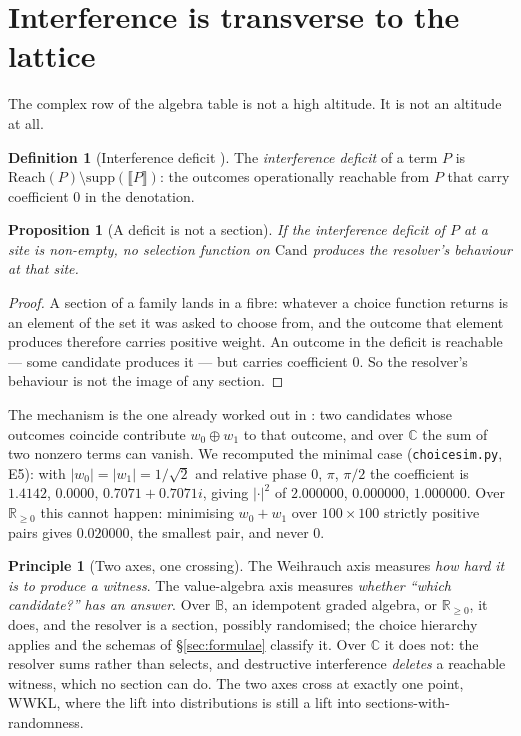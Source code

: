 \documentclass[11pt]{article}
\theoremstyle{definition}
\newtheorem{definition}{Definition}
\newtheorem{principle}{Principle}
\theoremstyle{plain}
\newtheorem{proposition}{Proposition}
\theoremstyle{remark}
\newcommand{\sumv}{\oplus}
\newcommand{\Bool}{\mathbb{B}}
\newcommand{\Rnn}{\mathbb{R}_{\geq 0}}
\newcommand{\Cx}{\mathbb{C}}
\newcommand{\Cand}{\mathrm{Cand}}
\newcommand{\sem}[1]{\llbracket #1 \rrbracket}
\newcommand{\WWKL}{\mathrm{WWKL}}
\begin{document}
\section{Interference is transverse to the lattice}\label{sec:transverse}

The complex row of the algebra table is not a high altitude. It is not an altitude at
all.

\begin{definition}[Interference deficit \cite{gradedwhere}]\label{def:deficit}
The \emph{interference deficit} of a term $P$ is
$\mathrm{Reach}(P) \setminus \mathrm{supp}(\sem{P})$: the outcomes operationally
reachable from $P$ that carry coefficient $0$ in the denotation.
\end{definition}

\begin{proposition}[A deficit is not a section]\label{prop:transverse}
If the interference deficit of $P$ at a site is non-empty, no selection function on
$\Cand$ produces the resolver's behaviour at that site.
\end{proposition}

\begin{proof}
A section of a family lands in a fibre: whatever a choice function returns is an
element of the set it was asked to choose from, and the outcome that element produces
therefore carries positive weight. An outcome in the deficit is reachable --- some
candidate produces it --- but carries coefficient $0$. So the resolver's behaviour is
not the image of any section.
\end{proof}

The mechanism is the one already worked out in \cite{gradedwhere}: two candidates whose
outcomes coincide contribute $w_0 \sumv w_1$ to that outcome, and over $\Cx$ the sum of
two nonzero terms can vanish. We recomputed the minimal case (\texttt{choicesim.py},
E5): with $|w_0| = |w_1| = 1/\sqrt2$ and relative phase $0$, $\pi$, $\pi/2$ the
coefficient is $1.4142$, $0.0000$, $0.7071{+}0.7071i$, giving $|{\cdot}|^2$ of
$2.000000$, $0.000000$, $1.000000$. Over $\Rnn$ this cannot happen: minimising
$w_0 + w_1$ over $100 \times 100$ strictly positive pairs gives $0.020000$, the
smallest pair, and never $0$.

\begin{principle}[Two axes, one crossing]\label{prin:axes}
The Weihrauch axis measures \emph{how hard it is to produce a witness}. The value-algebra
axis measures \emph{whether ``which candidate?'' has an answer}. Over $\Bool$, an
idempotent graded algebra, or $\Rnn$, it does, and the resolver is a section, possibly
randomised; the choice hierarchy applies and the schemas of \S\ref{sec:formulae}
classify it. Over $\Cx$ it does not: the resolver sums rather than selects, and
destructive interference \emph{deletes} a reachable witness, which no section can do.
The two axes cross at exactly one point, $\WWKL$, where the lift into distributions is
still a lift into sections-with-randomness.
\end{principle}
\end{document}
